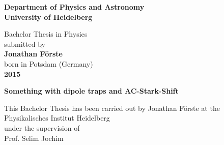 \pagestyle{empty}

\begin{titlepage}
\begin{center}
 
\Large\textbf{Department of Physics and Astronomy\\
University of Heidelberg}

\vspace{15.5cm}

\normalsize
Bachelor Thesis in Physics\\
submitted by\\
\vspace{0.5cm}
\Large\textbf{Jonathan Förste}\\
\normalsize
\vspace{0.5cm}
born in Potsdam (Germany)\\
\vspace{0.5cm}
\Large\textbf{2015}
\normalsize

\newpage




\Large\textbf{Something with dipole traps and AC-Stark-Shift}

\vspace{18cm}

\normalsize
This Bachelor Thesis has been carried out by Jonathan Förste at the\\
Physikalisches Institut Heidelberg\\
under the supervision of\\
Prof. Selim Jochim

\vfill
\end{center}

\end{titlepage}

\pagestyle{headings}
